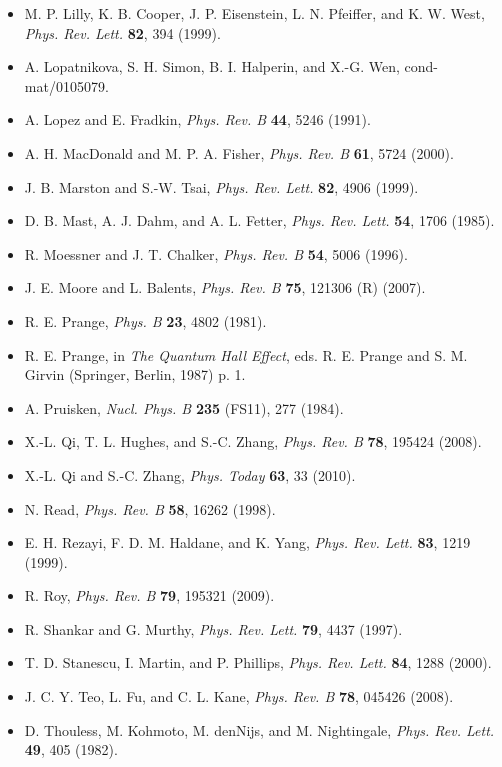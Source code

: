 \begin{itemize}[leftmargin=2em,itemsep=0pt,parsep=0pt,label={}]
\item [L1999] M. P. Lilly, K. B. Cooper, J. P. Eisenstein, L. N. Pfeiffer, and K. W. West, \emph{Phys. Rev. Lett.} \textbf{82}, 394 (1999).
\item [L2001] A. Lopatnikova, S. H. Simon, B. I. Halperin, and X.-G. Wen, cond-mat/0105079.
\item [LF1991] A. Lopez and E. Fradkin, \emph{Phys. Rev. B} \textbf{44}, 5246 (1991).
\item [MF2000] A. H. MacDonald and M. P. A. Fisher, \emph{Phys. Rev. B} \textbf{61}, 5724 (2000).
\item [MT1999] J. B. Marston and S.-W. Tsai, \emph{Phys. Rev. Lett.} \textbf{82}, 4906 (1999).
\item [MDF1985] D. B. Mast, A. J. Dahm, and A. L. Fetter, \emph{Phys. Rev. Lett.} \textbf{54}, 1706 (1985).
\item [MC1996] R. Moessner and J. T. Chalker, \emph{Phys. Rev. B} \textbf{54}, 5006 (1996).
\item [MB2007] J. E. Moore and L. Balents, \emph{Phys. Rev. B} \textbf{75}, 121306 (R) (2007).
\item [P1981] R. E. Prange, \emph{Phys. B} \textbf{23}, 4802 (1981).
\item [P1987] R. E. Prange, in \emph{The Quantum Hall Effect}, eds. R. E. Prange and S. M. Girvin (Springer, Berlin, 1987) p. 1.
\item [P1984] A. Pruisken, \emph{Nucl. Phys. B} \textbf{235} (FS11), 277 (1984).
\item [QHZ2008] X.-L. Qi, T. L. Hughes, and S.-C. Zhang, \emph{Phys. Rev. B} \textbf{78}, 195424 (2008).
\item [QZ2010] X.-L. Qi and S.-C. Zhang, \emph{Phys. Today} \textbf{63}, 33 (2010).
\item [R1998] N. Read, \emph{Phys. Rev. B} \textbf{58}, 16262 (1998).
\item [RHY1999] E. H. Rezayi, F. D. M. Haldane, and K. Yang, \emph{Phys. Rev. Lett.} \textbf{83}, 1219 (1999).
\item [R2009] R. Roy, \emph{Phys. Rev. B} \textbf{79}, 195321 (2009).
\item [SM1997] R. Shankar and G. Murthy, \emph{Phys. Rev. Lett.} \textbf{79}, 4437 (1997).
\item [SMP2000] T. D. Stanescu, I. Martin, and P. Phillips, \emph{Phys. Rev. Lett.} \textbf{84}, 1288 (2000).
\item [TFK2008] J. C. Y. Teo, L. Fu, and C. L. Kane, \emph{Phys. Rev. B} \textbf{78}, 045426 (2008).
\item [T1982] D. Thouless, M. Kohmoto, M. denNijs, and M. Nightingale, \emph{Phys. Rev. Lett.} \textbf{49}, 405 (1982).

\end{itemize}

